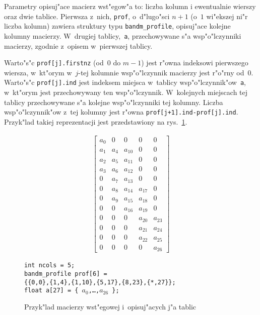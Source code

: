 \vspace{\bigskipamount}

Parametry opisuj"ace macierz wst"egow"a to: liczba kolumn i ewentualnie
wierszy oraz dwie tablice. Pierwsza z~nich, \texttt{prof}, o~d"lugo"sci
$n+1$ (o~$1$ wi"ekszej ni"r liczba kolumn) zawiera struktury typu
\texttt{bandm\_profile}, opisuj"ace kolejne kolumny macierzy. W~drugiej
tablicy,~\texttt{a}, przechowywane s"a wsp"o"lczynniki macierzy,
zgodnie z~opisem w~pierwszej tablicy.

Warto"s"c \texttt{prof[j].firstnz} (od~$0$ do $m-1$) jest r"owna indeksowi
pierwszego wiersza, w~kt"orym w~$j$-tej kolumnie wsp"o"lczynnik macierzy
jest r"o"rny od~$0$. Warto"s"c \texttt{prof[j].ind} jest indeksem miejsca
w~tablicy wsp"o"lczynnik"ow~\texttt{a}, w~kt"orym jest przechowywany ten
wsp"o"lczynnik. W~kolejnych miejscach tej tablicy przechowywane s"a kolejne
wsp"o"lczynniki tej kolumny. Liczba wsp"o"lczynnik"ow z~tej kolumny jest
r"owna \texttt{prof[j+1].ind-prof[j].ind}. Przyk"lad takiej reprezentacji
jest przedstawiony na rys.~\ref{fig:band:matrix}.
\begin{figure}[ht]
  \begin{minipage}{1.82in}
  \begin{align*}
    \left[\begin{array}{ccccc}
      a_0 &   0 &      0 &      0 &   0    \\
      a_1 & a_4 & a_{10} &      0 &   0    \\
      a_2 & a_5 & a_{11} &      0 &   0    \\
      a_3 & a_6 & a_{12} &      0 &   0    \\
        0 & a_7 & a_{13} &      0 &   0    \\
        0 & a_8 & a_{14} & a_{17} &   0    \\
        0 & a_9 & a_{15} & a_{18} &   0    \\
        0 &   0 & a_{16} & a_{19} &   0    \\
        0 &   0 &      0 & a_{20} & a_{23} \\
        0 &   0 &      0 & a_{21} & a_{24} \\
        0 &   0 &      0 & a_{22} & a_{25} \\
        0 &   0 &      0 &      0 & a_{26}
    \end{array}\right]
  \end{align*}
  \end{minipage}
  \begin{minipage}{3.05in}
    \texttt{int ncols = 5;} \\[10pt]
    \texttt{bandm\_profile prof[6] = \\
     \{\{0,0\},\{1,4\},\{1,10\},\{5,17\},\{8,23\},\{*,27\}\};} \\[10pt]
    \texttt{float a[27] = \{ $a_0$,\ldots,$a_{26}$ \};}
  \end{minipage}
  \caption{\label{fig:band:matrix}Przyk"lad macierzy wst"egowej
    i~opisuj"acych j"a tablic}
\end{figure}


